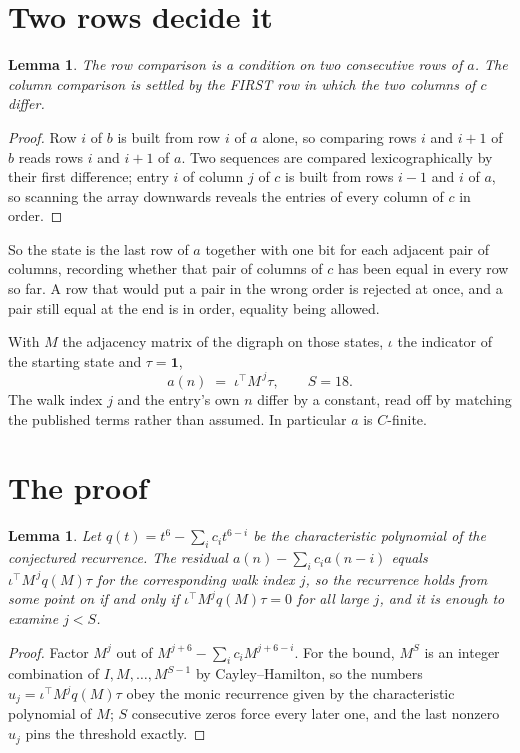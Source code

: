 \documentclass[11pt,a4paper]{article}
\theoremstyle{plain}
\newtheorem{lemma}[theorem]{Lemma}
\theoremstyle{definition}
\begin{document}
\section{Two rows decide it}

\begin{lemma}\label{lem:win}
The row comparison is a condition on two consecutive rows of $a$. The column comparison is
settled by the FIRST row in which the two columns of $c$ differ.
\end{lemma}

\begin{proof}
Row $i$ of $b$ is built from row $i$ of $a$ alone, so comparing rows $i$ and $i+1$ of $b$ reads
rows $i$ and $i+1$ of $a$. Two sequences are compared lexicographically by their first
difference; entry $i$ of column $j$ of $c$ is built from rows $i-1$ and $i$ of $a$, so scanning
the array downwards reveals the entries of every column of $c$ in order.
\end{proof}

So the state is the last row of $a$ together with one bit for each adjacent pair of columns,
recording whether that pair of columns of $c$ has been equal in every row so far. A row that
would put a pair in the wrong order is rejected at once, and a pair still equal at the end is
in order, equality being allowed.

With $M$ the adjacency matrix of the digraph on those states, $\iota$ the indicator of the
starting state and $\tau=\mathbf{1}$,
\[
a(n)\;=\;\iota^{\!\top}M^{\,j}\tau ,\qquad S=18.
\]
The walk index $j$ and the entry's own $n$ differ by a constant, read off by matching the
published terms rather than assumed. In particular $a$ is $C$-finite.

\section{The proof}

\begin{lemma}\label{lem:crit}
Let $q(t)=t^{6}-\sum_i c_it^{6-i}$ be the characteristic polynomial of the
conjectured recurrence. The residual $a(n)-\sum_ic_ia(n-i)$ equals
$\iota^{\!\top}M^{\,j}q(M)\tau$ for the corresponding walk index $j$, so the recurrence
holds from some point on if and only if $\iota^{\!\top}M^{j}q(M)\tau=0$ for all large $j$,
and it is enough to examine $j<S$.
\end{lemma}

\begin{proof}
Factor $M^{j}$ out of $M^{j+6}-\sum_ic_iM^{j+6-i}$. For the bound, $M^{S}$
is an integer combination of $I,M,\dots,M^{S-1}$ by Cayley--Hamilton, so the numbers
$u_j=\iota^{\!\top}M^{j}q(M)\tau$ obey the monic recurrence given by the characteristic
polynomial of $M$; $S$ consecutive zeros force every later one, and the last nonzero $u_j$
pins the threshold exactly.
\end{proof}
\end{document}
